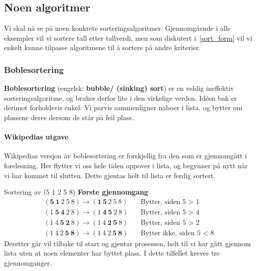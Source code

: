 \subsection{\color{red}Noen algoritmer}
Vi skal nå se på noen konkrete sorteringsalgoritmer. Gjennomgående i alle
eksempler vil vi sortere tall etter tallverdi, men som diskutert i~\ref{sort_form} vil vi enkelt kunne tilpasse algoritmene til å sortere på andre kriterier. 


\subsubsection{Boblesortering}
\label{bubblesort}
\textbf{Boblesortering} (engelsk: \textbf{bubble/ (sinking) sort})  er en veldig ineffektiv sorteringsalgoritme, og brukes derfor lite i den virkelige verden. 
Idéen bak er derimot forholdsvis enkel:
Vi parvis sammenligner naboer i lista, og bytter om plassene deres dersom de står på feil plass.

\paragraph*{Wikipedias utgave}\label{sec:bubble-wiki}
Wikipedias versjon av boblesortering er forskjellig fra den som er gjennomgått i forelesning.
Her flytter vi oss hele tiden oppover i lista, og begynner på nytt når vi har kommet til slutten.
Dette gjentas helt til lista er ferdig sortert.

\begin{eks} Sortering av (5 1 2 5 8) \newline
  \textbf{Første gjennomgang}
  \begin{align*}
    (\mathbf{5}~ \mathbf{1}~ 2~ 5~ 8) \rightarrow (\mathbf{1}\, \mathbf{5} ~ 2 ~ 5 ~ 8) &\quad \text{Bytter, siden 5 > 1} \\
    (1~ \mathbf{5}~ \mathbf{4}~ 2~ 8) \rightarrow (1 ~ \mathbf{4} ~ \mathbf{5} ~ 2 ~ 8) &\quad \text{Bytter, siden 5 > 4} \\
    (1~ 4~ \mathbf{5}~ \mathbf{2}~ 8) \rightarrow (1~ 4~ \mathbf{2}~ \mathbf{5}~ 8)     &\quad \text{Bytter, siden 5 > 2} \\
    (1~ 4~ 2~ \mathbf{5}~ \mathbf{8}) \rightarrow (1~ 4~ 2~ \mathbf{5}~ \mathbf{8})     &\quad \text{Bytter ikke, siden 5 < 8}
  \end{align*}
  Deretter går vil tilbake til start og gjentar prosessen, helt til vi har gått gjennom lista uten at noen elementer har byttet plass.
  I dette tilfellet kreves tre gjennomganger.
\end{eks}


